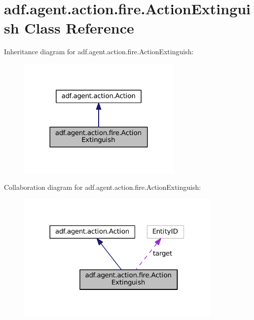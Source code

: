 \hypertarget{classadf_1_1agent_1_1action_1_1fire_1_1ActionExtinguish}{}\section{adf.\+agent.\+action.\+fire.\+Action\+Extinguish Class Reference}
\label{classadf_1_1agent_1_1action_1_1fire_1_1ActionExtinguish}


Inheritance diagram for adf.\+agent.\+action.\+fire.\+Action\+Extinguish\+:
\nopagebreak
\begin{figure}[H]
\begin{center}
\leavevmode
\includegraphics[width=228pt]{classadf_1_1agent_1_1action_1_1fire_1_1ActionExtinguish__inherit__graph}
\end{center}
\end{figure}


Collaboration diagram for adf.\+agent.\+action.\+fire.\+Action\+Extinguish\+:
\nopagebreak
\begin{figure}[H]
\begin{center}
\leavevmode
\includegraphics[width=284pt]{classadf_1_1agent_1_1action_1_1fire_1_1ActionExtinguish__coll__graph}
\end{center}
\end{figure}
